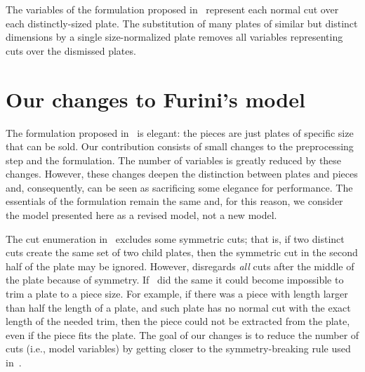 \documentclass[smallextended]{svjour3}       %
\begin{document}
The variables of the formulation proposed in~\cite{furini:2016} represent each normal cut over each distinctly-sized plate.
The substitution of many plates of similar but distinct dimensions by a single size-normalized plate removes all variables representing cuts over the dismissed plates.

\section{Our changes to Furini's model}


The formulation proposed in~\cite{furini:2016} is elegant: the pieces are just plates of specific size that can be sold.
Our contribution consists of small changes to the preprocessing step and the formulation.
The number of variables is greatly reduced by these changes.
However, these changes deepen the distinction between plates and pieces and, consequently, can be seen as sacrificing some elegance for performance.
The essentials of the formulation remain the same and, for this reason, we consider the model presented here as a revised model, not a new model.


The cut enumeration in~\cite{furini:2016} excludes some symmetric cuts; that is, if two distinct cuts create the same set of two child plates, then the symmetric cut in the second half of the plate may be ignored.
However, \cite{nicos:1977} disregards \emph{all} cuts after the middle of the plate because of symmetry.
If~\cite{furini:2016} did the same it could become impossible to trim a plate to a piece size.
For example, if there was a piece with length larger than half the length of a plate, and such plate has no normal cut with the exact length of the needed trim, then the piece could not be extracted from the plate, even if the piece fits the plate.
The goal of our changes is to reduce the number of cuts (i.e., model variables) by getting closer to the symmetry-breaking rule used in~\cite{nicos:1977}.
\end{document}
